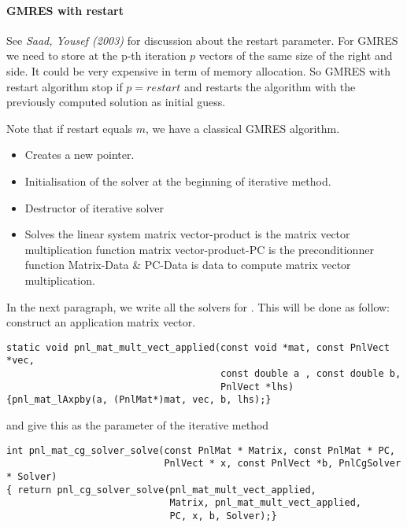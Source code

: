 \paragraph{GMRES with restart} See {\em Saad, Yousef (2003)} for discussion
about the restart parameter. For GMRES we need to store at the p-th iteration
$p$ vectors of the same size of the right and side. It could be very expensive
in term of memory allocation. So GMRES with restart algorithm stop if
$p=restart$ and restarts the algorithm with the previously computed solution
as initial guess.

Note that if restart equals $m$, we have a classical GMRES algorithm.

\begin{itemize}
\item {}
  \sshortdescribe Creates a new  pointer.  
\item {}
  \sshortdescribe Initialisation of the solver at the beginning of iterative method.  
\item {}
  \sshortdescribe Destructor of iterative solver  
\item {}
  \sshortdescribe Solves the linear system matrix vector-product is the matrix vector multiplication function matrix vector-product-PC is the preconditionner function Matrix-Data \& PC-Data is data to compute matrix vector multiplication.  
\end{itemize}


In the next paragraph, we write all the solvers for . This will be done as
follow: construct an application matrix vector.
\begin{verbatim}
static void pnl_mat_mult_vect_applied(const void *mat, const PnlVect *vec, 
                                      const double a , const double b, 
                                      PnlVect *lhs)
{pnl_mat_lAxpby(a, (PnlMat*)mat, vec, b, lhs);}
\end{verbatim}
and give this as the parameter of the iterative method
\begin{verbatim}
int pnl_mat_cg_solver_solve(const PnlMat * Matrix, const PnlMat * PC, 
                            PnlVect * x, const PnlVect *b, PnlCgSolver * Solver)
{ return pnl_cg_solver_solve(pnl_mat_mult_vect_applied, 
                             Matrix, pnl_mat_mult_vect_applied, 
                             PC, x, b, Solver);}
\end{verbatim}

